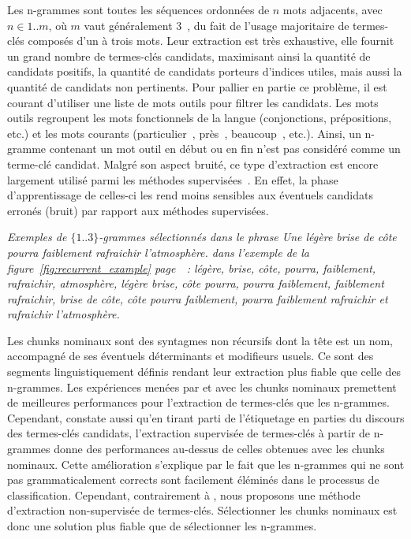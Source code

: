     Les n-grammes sont toutes les séquences ordonnées de $n$ mots adjacents,
    avec $n \in 1..m$, où $m$ vaut généralement
    3~\cite{witten1999kea,turney1999learningalgorithms,hulth2003keywordextraction},
    du fait de l'usage majoritaire de termes-clés composés d'un à trois mots.
    Leur extraction est très exhaustive, elle fournit un grand nombre de
    termes-clés candidats, maximisant ainsi la quantité de candidats positifs,
    la quantité de candidats porteurs d'indices utiles, mais aussi la quantité
    de candidats non pertinents. Pour pallier en partie ce problème, il est
    courant d'utiliser une liste de mots outils pour filtrer les candidats. Les
    mots outils regroupent les mots fonctionnels de la langue (conjonctions,
    prépositions, etc.) et les mots courants (\og particulier~\fg, \og près~\fg,
    \og beaucoup~\fg, etc.). Ainsi, un n-gramme contenant un mot outil en début
    ou en fin n'est pas considéré comme un terme-clé candidat. Malgré son aspect
    bruité, ce type d'extraction est encore largement utilisé parmi les méthodes
    supervisées~\cite{witten1999kea,turney1999learningalgorithms,hulth2003keywordextraction}.
    En effet, la phase d'apprentissage de celles-ci les rend moins sensibles aux
    éventuels candidats erronés (bruit) par rapport aux méthodes supervisées.

    \textit{
      Exemples de $\{1..3\}$-grammes sélectionnés dans le phrase \og{}Une légère
      brise de côte pourra faiblement rafraichir l'atmosphère.\fg{} dans
      l'exemple de la figure~\ref{fig:recurrent_example}
      page~\pageref{fig:recurrent_example}~: \og{}légère\fg{}, \og{}brise\fg{},
      \og{}côte\fg{}, \og{}pourra\fg{}, \og{}faiblement\fg{},
      \og{}rafraichir\fg{}, \og{}atmosphère\fg{}, \og{}légère brise\fg{},
      \og{}côte pourra\fg{}, \og{}pourra faiblement\fg{}, \og{}faiblement
      rafraichir\fg{}, \og{}brise de côte\fg{}, \og{}côte pourra
      faiblement\fg{}, \og{}pourra faiblement rafraichir\fg{} et \og{}rafraichir
      l'atmosphère\fg{}.}

    Les chunks nominaux sont des syntagmes non récursifs dont la tête est un
    nom, accompagné de ses éventuels déterminants et modifieurs usuels. Ce sont
    des segments linguistiquement définis rendant leur extraction plus fiable
    que celle des n-grammes. Les expériences menées par
     et  avec les
    chunks nominaux premettent de meilleures performances  pour l'extraction de
    termes-clés que les n-grammes. Cependant,
     constate aussi qu'en tirant parti de
    l'étiquetage en parties du discours des termes-clés candidats, l'extraction
    supervisée de termes-clés à partir de n-grammes donne des performances
    au-dessus de celles obtenues avec les chunks nominaux. Cette amélioration
    s'explique par le fait que les n-grammes qui ne sont pas grammaticalement
    corrects sont facilement éléminés dans le processus de classification.
    Cependant, contrairement à , nous
    proposons une méthode d'extraction non-supervisée de termes-clés.
    Sélectionner les chunks nominaux est donc une solution plus fiable que de
    sélectionner les n-grammes.

